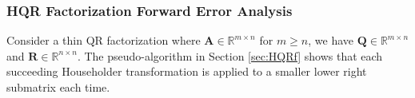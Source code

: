 \documentclass[review,onefignum,onetabnum]{siamart190516}
\newcommand{\R}{\mathbb{R}}
\newcommand{\tth}{\theta}
\newcommand{\bb}[1]{\mathbf{#1}}
\begin{document}
\subsubsection{HQR Factorization Forward Error Analysis}

Consider a thin QR factorization where $\bb{A}\in\R^{m\times n}$ for $m\geq n$, we have $\bb{Q}\in\R^{m\times n}$ and $\bb{R}\in\R^{n\times n}$.
The pseudo-algorithm in Section \ref{sec:HQRf} shows that each succeeding Householder transformation is applied to a smaller lower right submatrix each time. \par
\end{document}
